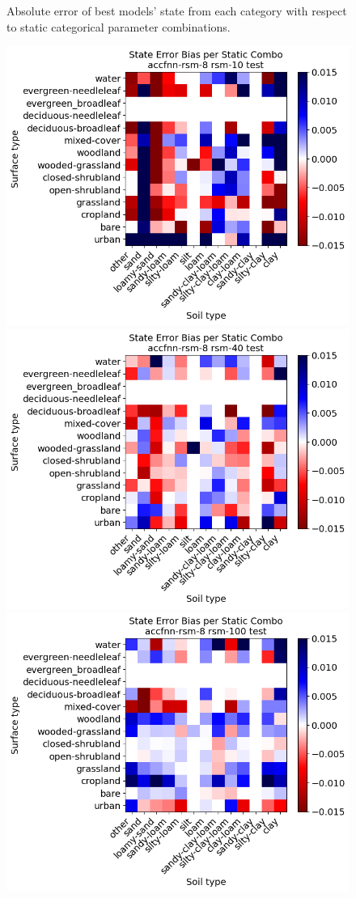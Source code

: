 \begin{figure}[hp!]

    \caption{Absolute error of best models' state from each category with respect to static categorical parameter combinations.}
    \label{best-static-abserr}
\end{figure}

\begin{figure}[hp!]
    \centering

    \includegraphics[width=.32\linewidth,draft=false]{figures/static-combos/eval_test_accfnn-rsm-8_rsm-10_static-combos_bias_state.png}
    \includegraphics[width=.32\linewidth,draft=false]{figures/static-combos/eval_test_accfnn-rsm-8_rsm-40_static-combos_bias_state.png}
    \includegraphics[width=.32\linewidth,draft=false]{figures/static-combos/eval_test_accfnn-rsm-8_rsm-100_static-combos_bias_state.png}


\end{figure}
